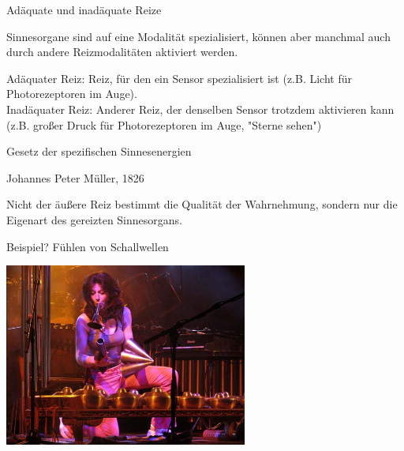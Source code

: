 \documentclass{beamer}
\begin{document}
\begin{frame}{Adäquate und inadäquate Reize}

Sinnesorgane sind auf eine Modalität spezialisiert, können aber manchmal auch durch andere Reizmodalitäten aktiviert werden. \\[0.5 cm]

\pause


Adäquater Reiz: Reiz, für den ein Sensor spezialisiert ist (z.B. Licht für Photorezeptoren im Auge).  \\[0.2 cm]

Inadäquater Reiz: Anderer Reiz, der denselben Sensor trotzdem aktivieren kann (z.B. großer Druck für Photorezeptoren im Auge, "Sterne sehen") \\ [0.2]


\end{frame}




\begin{frame}{Gesetz der spezifischen Sinnesenergien}


\begin{block}{Johannes Peter Müller, 1826}

Nicht der äußere Reiz bestimmt die Qualität der Wahrnehmung, sondern nur die Eigenart des gereizten Sinnesorgans.

\end{block}


\pause 
Beispiel? \pause Fühlen von Schallwellen
    
    
\begin{center}
    \includegraphics[width=0.6\textwidth]{evelyn_glennie.jpg}
\end{center}


    
\end{frame}
\end{document}
